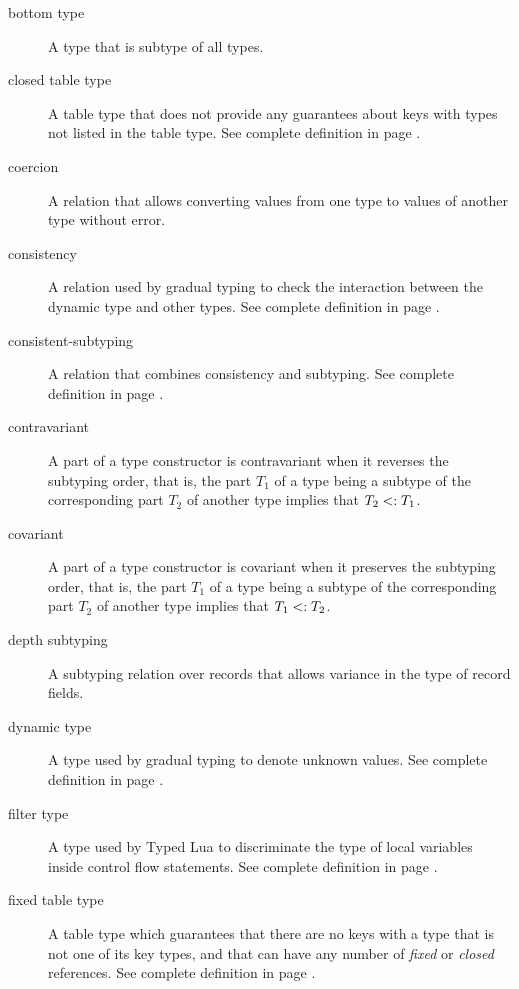 \begin{description}
\item[bottom type] A type that is subtype of all types.

\item[closed table type] A table type that does not provide any guarantees
about keys with types not listed in the table type.
See complete definition in page \pageref{def:tabletype}.

\item[coercion] A relation that allows converting values from one type to
values of another type without error.

\item[consistency] A relation used by gradual typing to check the interaction
between the dynamic type and other types.
See complete definition in page \pageref{def:consistency}.

\item[consistent-subtyping] A relation that combines consistency and subtyping.
See complete definition in page \pageref{def:consistent-subtyping}.

\item[contravariant] A part of a type constructor is contravariant when it
reverses the subtyping order, that is, the part $T_{1}$ of a type being
a subtype of the corresponding part $T_{2}$ of another type implies that
$T_{2} <: T_{1}$.

\item[covariant] A part of a type constructor is covariant when it
preserves the subtyping order, that is, the part $T_{1}$ of a type being
a subtype of the corresponding part $T_{2}$ of another type implies that
$T_{1} <: T_{2}$.

\item[depth subtyping] A subtyping relation over records that allows variance
in the type of record fields.

\item[dynamic type] A type used by gradual typing to denote unknown values.
See complete definition in page \pageref{def:dynamictype}.

\item[filter type] A type used by Typed Lua to discriminate the type of
local variables inside control flow statements.
See complete definition in page \pageref{def:filtertype}.

\item[fixed table type] A table type which guarantees that there are no
keys with a type that is not one of its key types, and that can have
any number of \emph{fixed} or \emph{closed} references.
See complete definition in page \pageref{def:tabletype}.


\end{description}
